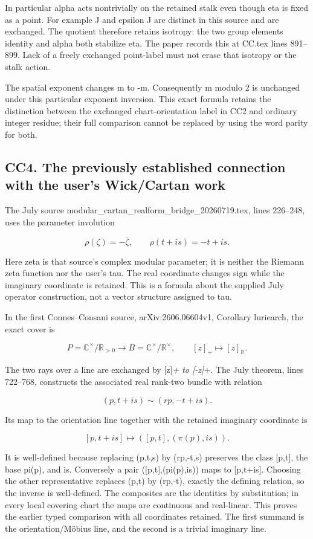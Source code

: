 \documentclass[
  11pt,
]{article}
\begin{document}
In particular alpha acts nontrivially on the retained stalk even though
eta is fixed as a point. For example J and epsilon J are distinct in
this source and are exchanged. The quotient therefore retains isotropy:
the two group elements identity and alpha both stabilize eta. The paper
records this at CC.tex lines 891--899. Lack of a freely exchanged
point-label must not erase that isotropy or the stalk action.

The spatial exponent changes m to -m. Consequently m modulo 2 is
unchanged under this particular exponent inversion. This exact formula
retains the distinction between the exchanged chart-orientation label in
CC2 and ordinary integer residue; their full comparison cannot be
replaced by using the word parity for both.

\subsection{CC4. The previously established connection with the user's
Wick/Cartan
work}\label{cc4.-the-previously-established-connection-with-the-users-wickcartan-work}

The July source modular\_cartan\_realform\_bridge\_20260719.tex, lines
226--248, uses the parameter involution

\[
\rho(\zeta)=-\overline\zeta,
\qquad \rho(t+is)=-t+is.
\]

Here zeta is that source's complex modular parameter; it is neither the
Riemann zeta function nor the user's tau. The real coordinate changes
sign while the imaginary coordinate is retained. This is a formula about
the supplied July operator construction, not a vector structure assigned
to tau.

In the first Connes--Consani source, arXiv:2606.06604v1, Corollary
luriearch, the exact cover is

\[
P=\mathbb C^\times/\mathbb R_{>0}
\longrightarrow
B=\mathbb C^\times/\mathbb R^\times,
\qquad [z]_+\longmapsto[z]_{\mathbb R}.
\]

The two rays over a line are exchanged by {[}z{]}\emph{+ to {[}-z{]}}+.
The July theorem, lines 722--768, constructs the associated real
rank-two bundle with relation

\[
(p,t+is)\sim(rp,-t+is).
\]

Its map to the orientation line together with the retained imaginary
coordinate is

\[
[p,t+is]\longmapsto([p,t],(\pi(p),is)).
\]

It is well-defined because replacing (p,t,s) by (rp,-t,s) preserves the
class {[}p,t{]}, the base pi(p), and is. Conversely a pair
({[}p,t{]},(pi(p),is)) maps to {[}p,t+is{]}. Choosing the other
representative replaces (p,t) by (rp,-t), exactly the defining relation,
so the inverse is well-defined. The composites are the identities by
substitution; in every local covering chart the maps are continuous and
real-linear. This proves the earlier typed comparison with all
coordinates retained. The first summand is the orientation/Möbius line,
and the second is a trivial imaginary line.
\end{document}
